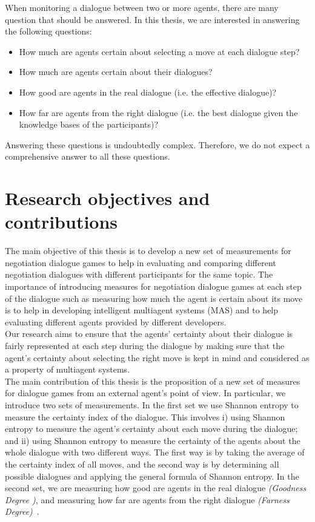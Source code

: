 \indent When monitoring a dialogue between two or more agents, there are many question that should be answered. In this thesis, we are interested in answering the following questions:

\begin{itemize}
\item How much are agents certain about selecting a move at each dialogue step?
\item How much are agents certain about their dialogues?
\item How good are agents in the real dialogue (i.e. the effective dialogue)?
\item How far are agents from the right dialogue (i.e. the best dialogue given the knowledge bases of the participants)?
\end{itemize}
Answering these questions is undoubtedly complex. Therefore, we do not expect a comprehensive answer to all these questions.



\section{Research objectives and contributions}\label{sec:contribution}

The main objective of this thesis is to develop a new set of measurements for negotiation dialogue games to help in evaluating and
comparing different negotiation dialogues with different participants for the same topic. The importance of introducing measures for
negotiation dialogue games at each step of the dialogue such as measuring how much the agent is certain about its move is to help in developing intelligent multiagent systems (MAS) and to help evaluating different agents provided by different developers.\\
\indent Our research aims to ensure that the agents' certainty about their dialogue is fairly represented at each step during
the dialogue by making sure that the agent's certainty about selecting the right move is kept in mind and considered as a property
of multiagent systems.\\
\indent The main contribution of this thesis is the proposition of a new set of measures for dialogue games from an external agent's point of view.
In particular, we introduce two sets of measurements. In the first set  we use Shannon entropy to measure the certainty index of the dialogue.
This involves i) using Shannon entropy to measure the agent's certainty about each move during the dialogue; and ii) using
Shannon entropy to measure the certainty of the agents about the whole dialogue with two different ways. The first way is
by taking the average of the certainty index of all moves, and the second way is by determining all possible dialogues and
applying the general formula of Shannon entropy. In the second set, we are measuring how good are agents in the real dialogue
\emph{(Goodness Degree )}, and measuring how far are agents from the right dialogue \emph{(Farness Degree)}~\cite{Marey09}.



